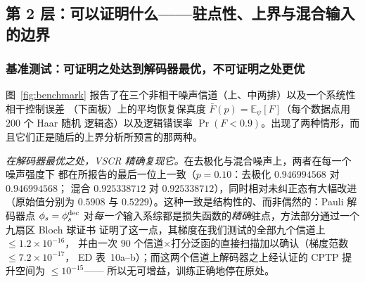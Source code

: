 \documentclass[11pt,a4paper]{article}
\begin{document}
\subsection*{第 2 层：可以证明什么——驻点性、上界与混合输入的边界}

\subsubsection*{基准测试：可证明之处达到解码器最优，不可证明之处更优}

图~\ref{fig:benchmark} 报告了在三个非相干噪声信道（上、中两排）以及一个系统性相干控制误差
（下面板）上的平均恢复保真度 $\bar F(p)=\mathbb{E}_\psi[F]$（每个数据点用 $200$ 个 Haar 随机
逻辑态）以及逻辑错误率 $\Pr(F<0.9)$。出现了两种情形，而且它们正是随后的上界分析所预言的那两种。

\emph{在解码器最优之处，VSCR 精确复现它。}在去极化与混合噪声上，两者在每一个噪声强度下
都在所报告的最后一位上一致（$p=0.10$：去极化 $0.946994568$ 对 $0.946994568$；
混合 $0.925338712$ 对 $0.925338712$），同时相对未纠正态有大幅改进（原始值分别为 $0.5908$ 与
$0.5229$）。这种一致是结构性的、而非偶然的：Pauli 解码器点 $\phi_s=\phi^{\rm dec}_s$
对\emph{每一个}输入系综都是损失函数的\emph{精确}驻点，方法部分通过一个九扇区 Bloch 球证书
证明了这一点，其梯度在我们测试的全部九个信道上 $\le1.2\times10^{-16}$，
并由一次 $90$ 个信道$\times$打分泛函的直接扫描加以确认（梯度范数 $\le7.2\times10^{-17}$，
ED 表~10a--b）；而这两个信道上解码器之上经认证的 CPTP 提升空间为 $\le10^{-15}$——
所以无可增益，训练正确地停在原处。
\end{document}
